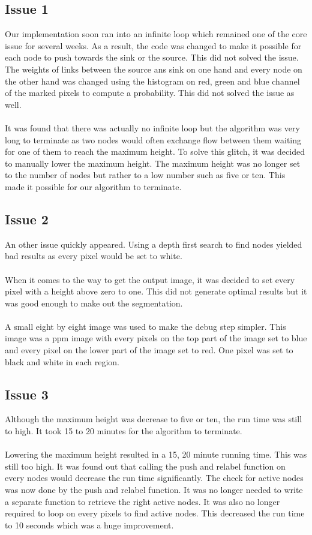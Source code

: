 \documentclass{article}
\begin{document}
\subsection{Issue 1}

Our implementation soon ran into an infinite loop which remained one of the core issue for several weeks. As a result, the code was changed to make it possible for each node to push towards the sink or the source. This did not solved the issue. The weights of links between the source ans sink on one hand and every node on the other hand was changed using the histogram on red, green and blue channel of the marked pixels to compute a probability. This did not solved the issue as well.\\
\\
It was found that there was actually no infinite loop but the algorithm was very long to terminate as two nodes would often exchange flow between them waiting for one of them to reach the maximum height. To solve this glitch, it was decided to manually lower the maximum height. The maximum height was no longer set to the number of nodes but rather to a low number such as five or ten. This made it possible for our algorithm to terminate.

\subsection{Issue 2}

An other issue quickly appeared. Using a depth first search to find nodes yielded bad results as every pixel would be set to white.\\
\\
When it comes to the way to get the output image, it was decided to set every pixel with a height above zero to one. This did not generate optimal results but it was good enough to make out the segmentation.\\
\\
A small eight by eight image was used to make the debug step simpler. This image was a ppm image with every pixels on the top part of the image set to blue and every pixel on the lower part of the image set to red. One pixel was set to black and white in each region.

\subsection{Issue 3}

Although the maximum height was decrease to five or ten, the run time was still to high. It took 15 to 20 minutes for the algorithm to terminate.\\
\\
Lowering the maximum height resulted in a 15, 20 minute running time. This was still too high. It was found out that calling the push and relabel function on every nodes would decrease the run time significantly. The check for active nodes was now done by the push and relabel function. It was no longer needed to write a separate function to retrieve the right active nodes. It was also no longer required to loop on every pixels to find active nodes. This decreased the run time to 10 seconds which was a huge improvement.
\end{document}
